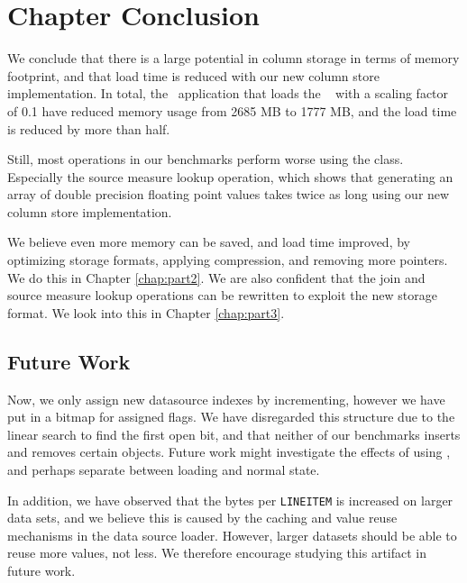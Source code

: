 \section{Chapter Conclusion}
\label{sec:Chapter Conclusion}
We conclude that there is a large potential in column storage in terms of memory footprint, and that load time is reduced with our new column store implementation. In total, the \gd~application that loads the \tpch~ with a scaling factor of 0.1 have reduced memory usage from 2685 MB to 1777 MB, and the load time is reduced by more than half.

Still, most operations in our benchmarks perform worse using the  class. Especially the source measure lookup operation, which shows that generating an array of double precision floating point values takes twice as long using our new column store implementation.

We believe even more memory can be saved, and load time improved, by optimizing storage formats, applying compression, and removing more pointers. We do this in Chapter \ref{chap:part2}. We are also confident that the join and source measure lookup operations can be rewritten to exploit the new storage format. We look into this in Chapter \ref{chap:part3}.

\subsection{Future Work}
\label{sub:Future Work}
Now, we only assign new datasource indexes by incrementing, however we have put in a bitmap for assigned flags. We have disregarded this structure due to the linear search to find the first open bit, and that neither of our benchmarks inserts and removes certain objects. Future work might investigate the effects of using , and perhaps separate between loading and normal state.

In addition, we have observed that the bytes per \texttt{LINEITEM} is increased on larger data sets, and we believe this is caused by the caching and value reuse mechanisms in the data source loader. However, larger datasets should be able to reuse more values, not less. We therefore encourage studying this artifact in future work.
